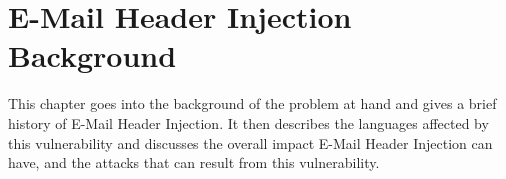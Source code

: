 \section{E-Mail Header Injection Background}
This chapter goes into the background of the problem at hand and gives a brief history of E-Mail Header Injection. It then describes the languages affected by this vulnerability and discusses the overall impact E-Mail Header Injection can have, and the attacks that can result from this vulnerability.




